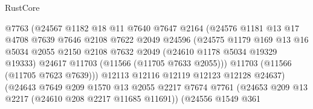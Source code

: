 \begin{lexlean}{RustCore}
\begin{coremodule}
                                    @7763
                                    (@24567
                                      @1182
                                      @18
                                      @11
                                      @7640
                                      @7647
                                      @2164
                                      (@24576
                                        @1181
                                        @13
                                        @17
                                        @4708
                                        @7639
                                        @7646
                                        @2108
                                        @7622
                                        @2049
                                        @24596
                                        (@24575
                                          @1179
                                          @169
                                          @13
                                          @16
                                          @5034
                                          @2055
                                          @2150
                                          @2108
                                          @7632
                                          @2049
                                          (@24610 @1178 @5034 @19329 @19333)
                                          @24617
                                          @11703
                                          (@11566 (@11705 @7633 @2055)))
                                        @11703
                                        (@11566 (@11705 @7623 @7639)))
                                      @12113
                                      @12116
                                      @12119
                                      @12123
                                      @12128
                                      @24637)
                                    (@24643
                                      @7649
                                      @209
                                      @1570
                                      @13
                                      @2055
                                      @2217
                                      @7674
                                      @7761
                                      (@24653 @209 @13 @2217 (@24610 @208 @2217 @11685 @11691))
                                      (@24556
                                        @1549
                                        @361

\end{coremodule}
\end{lexlean}
